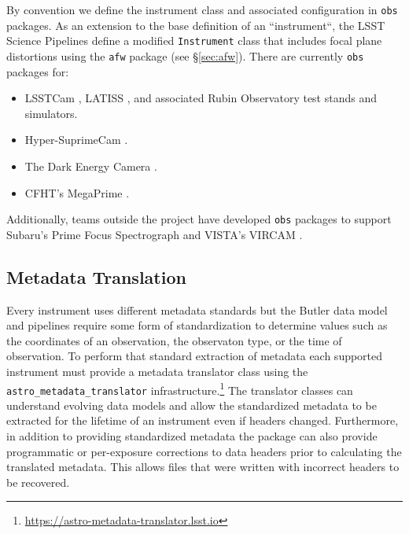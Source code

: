 By convention we define the instrument class and associated configuration in \texttt{obs} packages.
As an extension to the base definition of an ``instrument``, the LSST Science Pipelines define a modified \texttt{Instrument} class that includes focal plane distortions using the \texttt{afw} package (see \S\ref{sec:afw}).
There are currently \texttt{obs} packages for:

\begin{itemize}
\item LSSTCam \citep{2010SPIE.7735E..0JK}, LATISS \citep{2020SPIE11452E..0UI}, and associated Rubin Observatory test stands and simulators.
\item Hyper-SuprimeCam \citep{2018PASJ...70S...1M}.
\item The Dark Energy Camera \citep{2008SPIE.7014E..0ED}.
\item CFHT's MegaPrime \citep{2003SPIE.4841...72B}.
\end{itemize}

Additionally, teams outside the project have developed \texttt{obs} packages to support Subaru's Prime Focus Spectrograph \citep{2020SPIE11447E..7VW} and VISTA's VIRCAM \citep{2015A&A...575A..25S}.

\subsection{Metadata Translation}

Every instrument uses different metadata standards but the Butler data model and pipelines require some form of standardization to determine values such as the coordinates of an observation, the observaton type, or the time of observation.
To perform that standard extraction of metadata each supported instrument must provide a metadata translator class using the \texttt{astro\_metadata\_translator} infrastructure.\footnote{\url{https://astro-metadata-translator.lsst.io}}
The translator classes can understand evolving data models and allow the standardized metadata to be extracted for the lifetime of an instrument even if headers changed.
Furthermore, in addition to providing standardized metadata the package can also provide programmatic or per-exposure corrections to data headers prior to calculating the translated metadata.
This allows files that were written with incorrect headers to be recovered.
